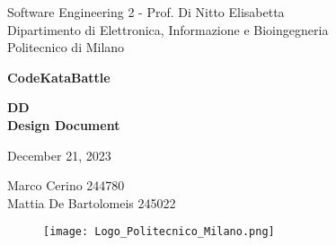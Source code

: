 \documentclass{article}
\begin{document}
\begin{titlepage}
  \centering
  {\normalsize
    Software Engineering 2 - Prof. Di Nitto Elisabetta \\
    Dipartimento di Elettronica, Informazione e Bioingegneria \\
    Politecnico di Milano \par
  }     \vspace{3cm}
  {\Huge \textbf{CodeKataBattle\\} } \vspace{1cm}
  {\large \textbf{DD\\Design Document} \par} \vspace{1cm}
  {\normalsize December 21, 2023 \par} \vspace{4cm}
  {\normalsize Marco Cerino 244780 \\ Mattia De Bartolomeis 245022 \par} \vspace{4cm}
  \begin{figure}[h]
    \centering
    \texttt{[image: Logo\_Politecnico\_Milano.png]}
  \end{figure} \vspace{0.5cm}
\end{titlepage}

\tableofcontents








\end{document}
